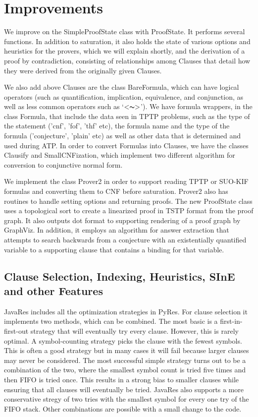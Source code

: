 \documentclass{llncs}
\begin{document}
\section{Improvements}

We improve on the SimpleProofState class with ProofState. It performs several functions.  In addition
to saturation, it also holds the state of various options and heuristics for
the provers, which we will explain shortly, and the derivation of a proof by contradiction,
consisting of relationships among Clauses that detail how they were derived from the originally
given Clauses.

We also add above Clauses are the class BareFormula, which can have logical operators (such as quantification, implication, equivalence,
and conjunction, as well as less common operators such as `$<\thicksim>$').  We have formula wrappers, in the class Formula,
that include the data seen in TPTP problems, such as the type of the statement ('cnf', 'fof', 'thf' etc),
the formula name and the type of the formula ('conjecture', 'plain' etc) as well as other data
that is determined and used during ATP. In order to convert Formulas
into Clauses, we have the classes Clausify and SmallCNFization, which implement two different algorithm
for conversion to conjunctive normal form.

We implement the class Prover2 in order to support reading TPTP or SUO-KIF formulas and converting them
to CNF before saturation.  Prover2 also has routines to handle setting options and returning proofs.  The new
ProofState class uses a topological sort \cite{DBLP:journals/cacm/Kahn62} to create a linearized proof in
TSTP format from the proof graph.  It also outputs dot format to supporting rendering of a proof graph
by GraphViz.  In addition, it employs an algorithm for answer extraction that attempts to search backwards
from a conjecture with an existentially quantified variable to a supporting clause that contains a binding
for that variable.

\subsection{Clause Selection, Indexing, Heuristics, SInE and other Features}

JavaRes includes all the optimization strategies in PyRes.  For clause selection it implements two methods,
which can be combined.  The most basic is a first-in-first-out strategy that will eventually try every
clause.  However, this is rarely optimal.  A symbol-counting strategy picks the clause with the fewest
symbols.  This is often a good strategy but in many cases it will fail because larger clauses may never
be considered.  The most successful simple strategy turns out to be a combination of the two, where the
smallest symbol count is tried five times and then FIFO is tried once.  This results in a strong bias to
smaller clauses while ensuring that all clauses will eventually be tried.  JavaRes also supports a more
conservative stregy of two tries with the smallest symbol for every one try of the FIFO stack.  Other
combinations are possible with a small change to the code.
\end{document}

